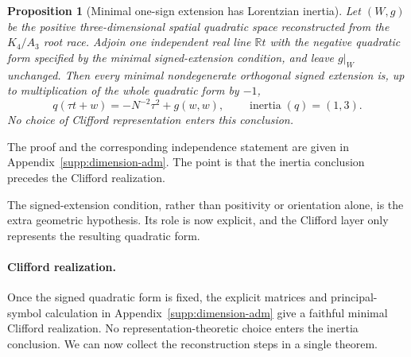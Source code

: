 \documentclass[11pt]{article}
\numberwithin{equation}{section}
\newtheorem{proposition}[proposition]{Proposition}
\theoremstyle{definition}
\theoremstyle{remark}
\newcommand{\R}{\mathbb R}
\begin{document}
\begin{proposition}[Minimal one-sign extension has Lorentzian inertia]
\label{prop:main-signature-minimality}
Let $(W,g)$ be the positive three-dimensional spatial quadratic space
reconstructed from the $K_4/A_3$ root race.  Adjoin one independent real line
$\R t$ with the negative quadratic form specified by the minimal
signed-extension condition, and leave
$g|_W$ unchanged.  Then every minimal nondegenerate orthogonal signed extension
is, up to multiplication of the whole quadratic form by $-1$,
\begin{equation}
 \boxed{q(\tau t+w)=-N^{-2}\tau^2+g(w,w),
 \qquad \operatorname{inertia}(q)=(1,3).}
 \label{eq:main-signature-inertia}
\end{equation}
No choice of Clifford representation enters this conclusion.
\end{proposition}

The proof and the corresponding independence statement are given in
Appendix~\ref{supp:dimension-adm}.  The point is that the inertia conclusion
precedes the Clifford realization.

The signed-extension condition, rather than positivity or orientation alone,
is the extra geometric hypothesis. Its role is now explicit, and the
Clifford layer only represents the resulting quadratic form.

\paragraph{Clifford realization.}
Once the signed quadratic form is fixed, the explicit matrices and
principal-symbol calculation in Appendix~\ref{supp:dimension-adm}
give a faithful minimal Clifford realization. No representation-theoretic
choice enters the inertia conclusion. We can now collect the reconstruction
steps in a single theorem.
\end{document}
